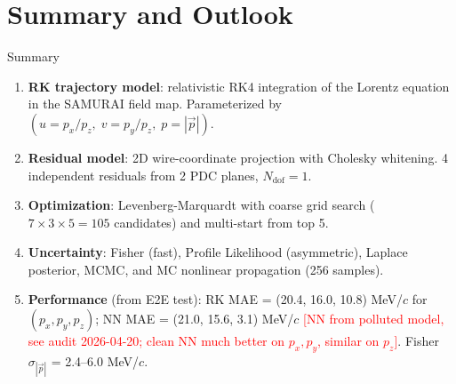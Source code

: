 \documentclass[aspectratio=169]{beamer}
\begin{document}
\section{Summary and Outlook}

\begin{frame}{Summary}
\small
\begin{enumerate}
\item \textbf{RK trajectory model}: relativistic RK4 integration of the Lorentz equation in the SAMURAI field map. Parameterized by $(u = p_x/p_z,\; v = p_y/p_z,\; p = |\vec{p}|)$.

\item \textbf{Residual model}: 2D wire-coordinate projection with Cholesky whitening. 4 independent residuals from 2 PDC planes, $N_\mathrm{dof} = 1$.

\item \textbf{Optimization}: Levenberg-Marquardt with coarse grid search ($7{\times}3{\times}5 = 105$ candidates) and multi-start from top 5.

\item \textbf{Uncertainty}: Fisher (fast), Profile Likelihood (asymmetric), Laplace posterior, MCMC, and MC nonlinear propagation (256 samples).

\item \textbf{Performance} (from E2E test): RK MAE = (20.4, 16.0, 10.8) MeV/$c$ for $(p_x, p_y, p_z)$; NN MAE = (21.0, 15.6, 3.1) MeV/$c$ \textcolor{red}{[NN from polluted model, see audit 2026-04-20; clean NN much better on $p_x,p_y$, similar on $p_z$]}. Fisher $\sigma_{|\vec{p}|}$ = 2.4--6.0 MeV/$c$.
\end{enumerate}
\end{frame}
\end{document}
